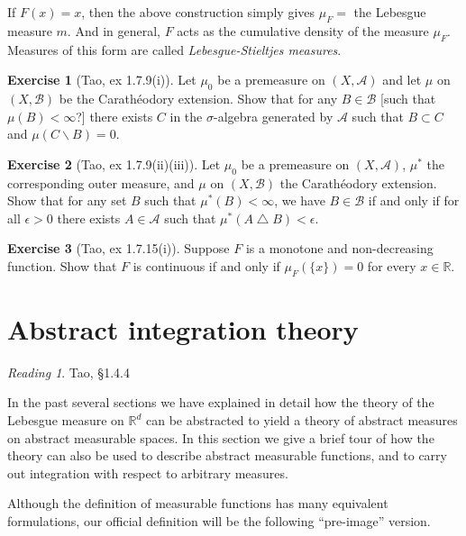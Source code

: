 \documentclass[11pt,oneside]{amsbook}
\renewcommand{\setminus}{\smallsetminus}
\renewcommand{\triangle}{\bigtriangleup}
\newcommand{\RR}{{\mathbb R}}
\theoremstyle{definition}
\newtheorem{exerc}{Exercise}[section]
\theoremstyle{plain}
\theoremstyle{definition}
\theoremstyle{remark}
\newtheorem*{reading}{Reading}
\numberwithin{equation}{section}
\numberwithin{figure}{section}
\begin{document}
If $F(x)=x$, then the above construction simply gives $\mu_F=$ the Lebesgue measure $m$. And in general, $F$ acts as the cumulative density of the measure $\mu_F$. Measures of this form are called \emph{Lebesgue-Stieltjes measures}.

\begin{exerc}[Tao, ex 1.7.9(i)]
  Let $\mu_0$ be a premeasure on $(X,\mathcal A)$ and let $\mu$ on $(X,\mathcal B)$ be the Carath\'eodory extension. Show that for any $B\in\mathcal B$ [such that $\mu(B)<\infty$?] there exists $C$ in the $\sigma$-algebra generated by $\mathcal A$ such that $B\subset C$ and $\mu(C\setminus B)=0$.
\end{exerc}

\begin{exerc}[Tao, ex 1.7.9(ii)(iii)]
  Let $\mu_0$ be a premeasure on $(X,\mathcal A)$, $\mu^*$ the corresponding outer measure, and $\mu$ on $(X,\mathcal B)$ the Carath\'eodory extension. Show that for any set $B$ such that $\mu^*(B)<\infty$, we have $B\in\mathcal B$ if and only if for all $\epsilon>0$ there exists $A\in\mathcal A$ such that $\mu^*(A\triangle B)<\epsilon$.
\end{exerc}

\begin{exerc}[Tao, ex 1.7.15(i)]
  Suppose $F$ is a monotone and non-decreasing function. Show that $F$ is continuous if and only if $\mu_F(\{x\})=0$ for every $x\in\RR$.
\end{exerc}

\newpage
\section{Abstract integration theory}

\begin{reading}
  Tao, \S 1.4.4
\end{reading}

In the past several sections we have explained in detail how the theory of the Lebesgue measure on $\RR^d$ can be abstracted to yield a theory of abstract measures on abstract measurable spaces. In this section we give a brief tour of how the theory can also be used to describe abstract measurable functions, and to carry out integration with respect to arbitrary measures.

Although the definition of measurable functions has many equivalent formulations, our official definition will be the following ``pre-image'' version.
\end{document}
